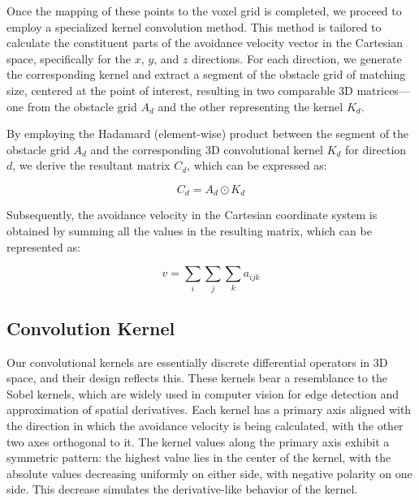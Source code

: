 \documentclass[a4paper]{article}
\begin{document}

Once the mapping of these points to the voxel grid is completed, we proceed to employ a specialized kernel convolution method. This method is tailored to calculate the constituent parts of the avoidance velocity vector in the Cartesian space, specifically for the \(x\), \(y\), and \(z\) directions. For each direction, we generate the corresponding kernel and extract a segment of the obstacle grid of matching size, centered at the point of interest, resulting in two comparable 3D matrices—one from the obstacle grid $A_d$ and the other representing the kernel $K_d$.

By employing the Hadamard (element-wise) product between the segment of the obstacle grid \(A_d\) and the corresponding 3D convolutional kernel \(K_d\) for direction \(d\), we derive the resultant matrix \(C_d\), which can be expressed as:

\begin{equation}
	C_d = A_d \odot K_d
	\label{eq:hadamard}
\end{equation}

Subsequently, the avoidance velocity in the Cartesian coordinate system is obtained by summing all the values in the resulting matrix, which can be represented as:

\begin{equation}
v = \sum_{i}\sum_{j}\sum_{k} a_{ijk} 
\label{summation}
\end{equation}

\subsection{Convolution Kernel}

Our convolutional kernels are essentially discrete differential operators in 3D space, and their design reflects this. These kernels bear a resemblance to the Sobel kernels, which are widely used in computer vision for edge detection and approximation of spatial derivatives. Each kernel has a primary axis aligned with the direction in which the avoidance velocity is being calculated, with the other two axes orthogonal to it. The kernel values along the primary axis exhibit a symmetric pattern: the highest value lies in the center of the kernel, with the absolute values decreasing uniformly on either side, with negative polarity on one side. This decrease simulates the derivative-like behavior of the kernel.
\end{document}
